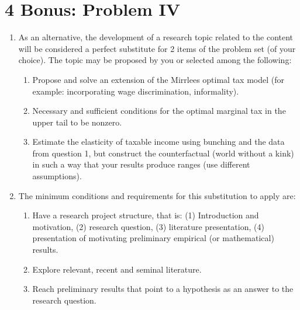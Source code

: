 \section*{4 \quad Bonus: Problem IV}

\begin{enumerate}[label=\roman*)]
    \item As an alternative, the development of a research topic related to the content will be considered a perfect substitute for 2 items of the problem set (of your choice). The topic may be proposed by you or selected among the following:
    \begin{enumerate}[label=\arabic*.]
        \item Propose and solve an extension of the Mirrlees optimal tax model (for example: incorporating wage discrimination, informality).
        \item Necessary and sufficient conditions for the optimal marginal tax in the upper tail to be nonzero.
        \item Estimate the elasticity of taxable income using bunching and the data from question 1, but construct the counterfactual (world without a kink) in such a way that your results produce ranges (use different assumptions).
    \end{enumerate}
    
    \item The minimum conditions and requirements for this substitution to apply are:
    \begin{enumerate}[label=\arabic*.]
        \item Have a research project structure, that is: (1) Introduction and motivation, (2) research question, (3) literature presentation, (4) presentation of motivating preliminary empirical (or mathematical) results.
        \item Explore relevant, recent and seminal literature.
        \item Reach preliminary results that point to a hypothesis as an answer to the research question.
    \end{enumerate}
\end{enumerate}
